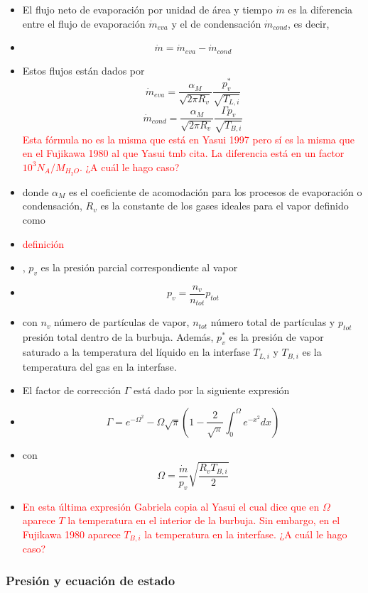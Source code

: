 \documentclass[aps,prb,onecolumn,superscriptaddress,floatfix,longbibliography,10pt]{revtex4-2}
\newif\ifptitle
\newif\ifpnumber
\newcounter{para}
\newcommand\ptitle[1]{\par\refstepcounter{para}
{\ifpnumber{\noindent\textcolor{lightgray}{\textbf{\thepara}}\indent}\fi}
{\ifptitle{\textbf{[{#1}]}}\fi}}
\begin{document}
\ptitle{Definición de $\dot{m}$}
\begin{itemize}
  \item El flujo neto de evaporación por unidad de área y tiempo $\dot{m}$ es la diferencia entre el flujo de evaporación $\dot{m}_{eva}$ y el de condensación $\dot{m}_{cond}$, es decir,
  \item \[\dot{m} = \dot{m}_{eva} - \dot{m}_{cond} \]
  \item Estos flujos están dados por
  \[\dot{m}_{eva} = \frac{\alpha_M}{\sqrt{2 \pi R_v}} \frac{p_v^*}{\sqrt{T_{L,i}}} \]
  \[\dot{m}_{cond} = \frac{\alpha_M}{\sqrt{2 \pi R_v}} \frac{\Gamma p_v}{\sqrt{T_{B,i}}}  \]
  \textcolor{red}{Esta fórmula no es la misma que está en Yasui 1997 pero sí es la misma que en el Fujikawa 1980 al que Yasui tmb cita. La diferencia está en un factor $10^3 N_A / M_{H_2O}$. ¿A cuál le hago caso?}
  \item donde $\alpha_M$ es el coeficiente de acomodación para los procesos de evaporación o condensación, $R_v$ es la constante de los gases ideales para el vapor definido como
  \item \textcolor{red}{definición}
  \item , $p_v$ es la presión parcial correspondiente al vapor
  \item \[p_v = \frac{n_v}{n_{tot}} p_{tot} \]
  \item con $n_v$ número de partículas de vapor, $n_{tot}$ número total de partículas y $p_{tot}$ presión total dentro de la burbuja. Además, $p_v^*$ es la presión de vapor saturado a la temperatura del líquido en la interfase $T_{L,i}$ y $T_{B,i}$ es la temperatura del gas en la interfase.
  \item El factor de corrección $\Gamma$ está dado por la siguiente expresión
  \item \[\Gamma = e^{-\Omega^2} - \Omega \sqrt{\pi} \left ( 1 - \frac{2}{\sqrt{\pi}} \int_0^{\Omega} e^{-x^2} dx \right ) \]
  \item con \[\Omega = \frac{\dot{m}}{p_v} \sqrt{\frac{R_v T_{B,i}}{2}}\]
  \item \textcolor{red}{En esta última expresión Gabriela copia al Yasui el cual dice que en $\Omega$ aparece $T$ la temperatura en el interior de la burbuja. Sin embargo, en el Fujikawa 1980 aparece $T_{B,i}$ la temperatura en la interfase. ¿A cuál le hago caso?}
\end{itemize}

\subsubsection{Presión y ecuación de estado}
\end{document}

